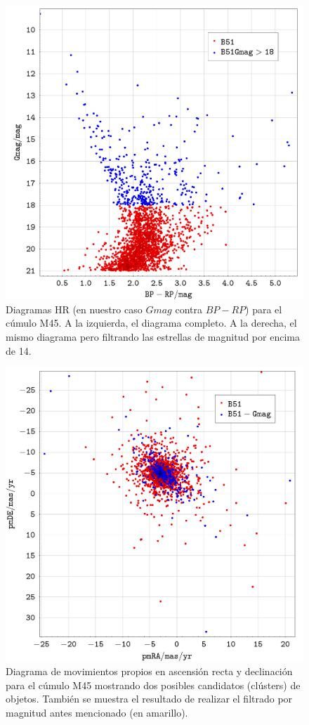 \documentclass[a4paper,fleqn,usenatbib]{mnras}
\begin{document}
\begin{figure}
  \includegraphics[width=\linewidth]{img/b51_bprp_gmag}
  \caption{Diagramas HR (en nuestro caso $Gmag$ contra $BP-RP$) para el cúmulo M45. A la izquierda, el diagrama completo. A la derecha, el mismo diagrama pero filtrando las estrellas de magnitud por encima de 14.}
  \label{fig:e2_b51_bprpgmag}
\end{figure}

\begin{figure}
  \includegraphics[width=\linewidth]{img/b51_pmra_pmde}
  \caption{Diagrama de movimientos propios en ascensión recta y declinación para el cúmulo M45 mostrando dos posibles candidatos (clústers) de objetos. También se muestra el resultado de realizar el filtrado por magnitud antes mencionado (en amarillo).}
  \label{fig:e2_b51_pmrapmde}
\end{figure}
\end{document}
